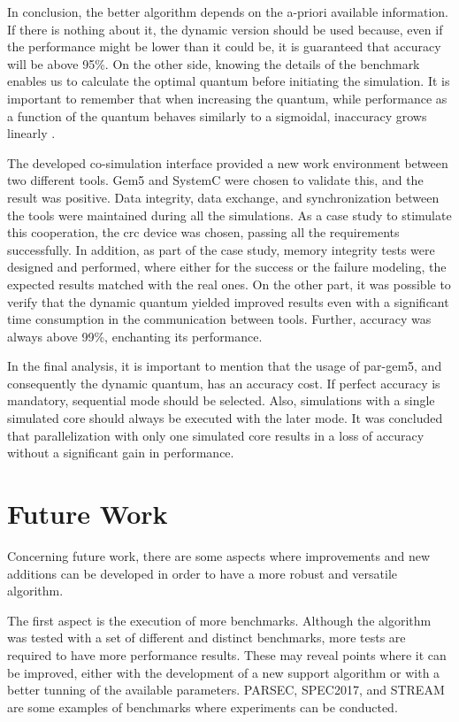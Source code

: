 In conclusion, the better algorithm depends on the a-priori available information. If there is nothing about it, the dynamic version should be 
used because, even if the performance might be lower than it could be, it is guaranteed that accuracy will be above 95\%. On the other side,
knowing the details of the benchmark enables us to calculate the optimal quantum before initiating the simulation. It is important to 
remember that when increasing the quantum, while performance as a function of the quantum behaves similarly to a sigmoidal, inaccuracy 
grows linearly \cite*{BeyondQuantumTDSim}. 

The developed co-simulation interface provided a new work environment between two different tools. Gem5 and SystemC were chosen to validate 
this, and the result was positive. Data integrity, data exchange, and synchronization between the tools were maintained during all the simulations. 
As a case study to stimulate this cooperation, the \gls{crc} device was chosen, 
passing all the requirements successfully. In addition, as part of the case study, 
memory integrity tests were designed and performed, where either for the success or the failure modeling, the expected results matched
with the real ones. On the other part, it was possible to verify that the dynamic quantum yielded improved results even with a significant 
time consumption in the communication between tools. Further, accuracy was always above 99\%, enchanting its performance. 

In the final analysis, it is important to mention that the usage of par-gem5, and consequently the dynamic quantum, has an accuracy cost. If 
perfect accuracy is mandatory, sequential mode should be selected. Also, simulations with a single simulated core should always be 
executed with the later mode. It was concluded that parallelization with only one simulated core results in a loss of accuracy 
without a significant gain in performance.


\section{Future Work}

Concerning future work, there are some aspects where improvements and new additions can be developed in order to have a more robust 
and versatile algorithm.

The first aspect is the execution of more benchmarks. Although the algorithm was tested with a set of different and distinct benchmarks, 
more tests are required to have more performance results. These may reveal points where it can be improved, either with the development
of a new support algorithm or with a better tunning of the available parameters. PARSEC, SPEC2017, and STREAM are some examples of 
benchmarks where experiments can be conducted. 

